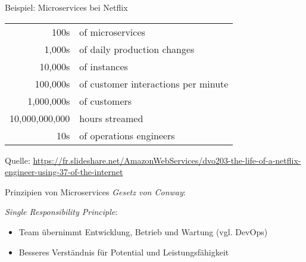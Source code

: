 \begin{frame}{Beispiel: Microservices bei Netflix}
	\large\bigskip\bigskip\bigskip\bigskip\bigskip
	\begin{center}
		\begin{tabular}{rl}
			100s & of microservices\\
			1,000s & of daily production changes\\
			10,000s & of instances\\
			100,000s & of customer interactions per minute\\
			1,000,000s & of customers\\
			10,000,000,000\phantom{s} & hours streamed\\
			10s & of operations engineers
		\end{tabular}
	\end{center}
	
	\bigskip\bigskip\bigskip\bigskip\hfill\tiny Quelle: \href{https://fr.slideshare.net/AmazonWebServices/dvo203-the-life-of-a-netflix-engineer-using-37-of-the-internet}{https://fr.slideshare.net/AmazonWebServices/dvo203-the-life-of-a-netflix-engineer-using-37-of-the-internet}
\end{frame}

\begin{frame}{Prinzipien von Microservices}
	\emph{Gesetz von Conway}: 
	
	\pause
	\emph{Single Responsibility Principle}: 
	
	\pause
	\begin{itemize}
		\item Team übernimmt Entwicklung, Betrieb und Wartung (vgl. DevOps)
		\item Besseres Verständnis für Potential und Leistungsfähigkeit
	\end{itemize}
\end{frame}

